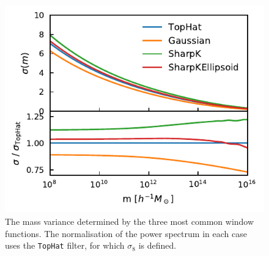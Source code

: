 \documentclass[5p,aas_macros]{elsarticle}
\begin{document}
\begin{figure}
  \centering
  \includegraphics[width=\linewidth]{figures/filter_models.pdf}
  \caption[Mass variance using three different filters]{The mass variance determined by the three most common window functions. The normalisation of the power spectrum in each case uses the \texttt{TopHat} filter, for which $\sigma_8$ is defined.}
  \label{fig:filter_sigma}
\end{figure}


\end{document}
